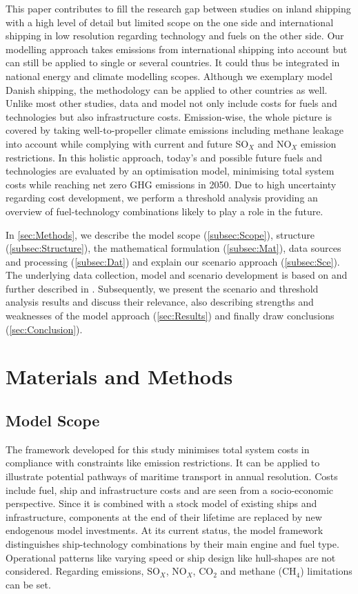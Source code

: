 \documentclass[article]{elsarticle}
\begin{document}
This paper contributes to fill the research gap between studies on inland shipping with a high level of detail but limited scope on the one side and international shipping in low resolution regarding technology and fuels on the other side. Our modelling approach takes emissions from international shipping into account but can still be applied to single or several countries. It could thus be integrated in national energy and climate modelling scopes. Although we exemplary model Danish shipping, the methodology can be applied to other countries as well.
Unlike most other studies, data and model not only include costs for fuels and technologies but also infrastructure costs. Emission-wise, the whole picture is covered by taking well-to-propeller climate emissions including methane leakage into account while complying with current and future SO$_X$ and NO$_X$ emission restrictions.
In this holistic approach, today's and possible future fuels and technologies are evaluated by an optimisation model, minimising total system costs while reaching net zero GHG emissions in 2050. Due to high uncertainty regarding cost development, we perform a threshold analysis providing an overview of fuel-technology combinations likely to play a role in the future.

In \autoref{sec:Methods}, we describe the model scope (\autoref{subsec:Scope}), structure (\autoref{subsec:Structure}), the mathematical formulation (\autoref{subsec:Mat}), data sources and processing (\autoref{subsec:Dat}) and explain our scenario approach (\autoref{subsec:Sce}). The underlying data collection, model and scenario development is based on and further described in \cite{Thesis2018}. Subsequently, we present the scenario and threshold analysis results and discuss their relevance, also describing strengths and weaknesses of the model approach (\autoref{sec:Results}) and finally draw conclusions (\autoref{sec:Conclusion}).  

\section{Materials and Methods}
\label{sec:Methods}

\subsection{Model Scope}
\label{subsec:Scope}
The framework developed for this study minimises total system costs in compliance with constraints like emission restrictions. It can be applied to illustrate potential pathways of maritime transport in annual resolution. Costs include fuel, ship and infrastructure costs and are seen from a socio-economic perspective. Since it is combined with a stock model of existing ships and infrastructure, components at the end of their lifetime are replaced by new endogenous model investments. At its current status, the model framework distinguishes ship-technology combinations by their main engine and fuel type. Operational patterns like varying speed or ship design like hull-shapes are not considered.
Regarding emissions, SO$_X$, NO$_X$, CO$_2$ and methane (CH$_4$) limitations can be set.
\end{document}
